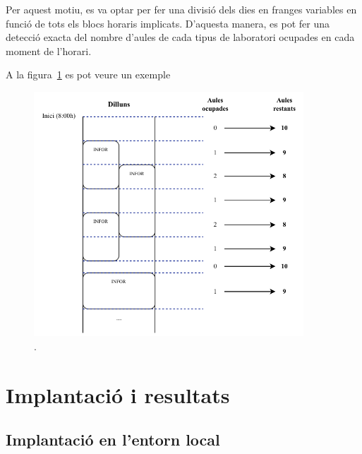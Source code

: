 \documentclass[a4paper,12pt]{ThesisStyle}
\begin{document}
Per aquest motiu, es va optar per fer una divisió dels dies en franges variables en funció de tots els blocs horaris implicats. D'aquesta manera, es pot fer una detecció exacta del nombre d'aules de cada tipus de laboratori ocupades en cada moment de l'horari.

A la figura~\ref{img:franges} es pot veure un exemple

\begin{figure}[H]
  \centering
  \includegraphics[width=0.9\textwidth]{assets/figs/franges.pdf}
  \caption{\label{img:franges} .}
\end{figure}




\chapter{Implantació i resultats}
\label{cap:implantacio}

\section{Implantació en l'entorn local}
\label{sec:implantacio}
\end{document}
